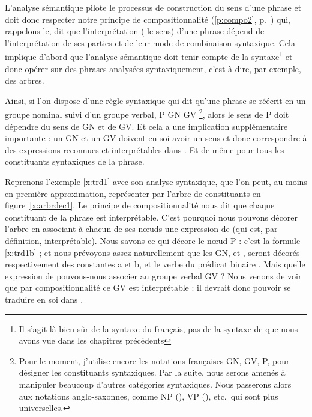 \sloppy

L'analyse sémantique pilote le processus de construction du sens d'une
phrase et doit donc respecter notre principe de compositionnalité
(\ref{p:compo2}, p.~\pageref{p:compo2}) qui, rappelons-le, dit que
l'interprétation ({\ie} le sens) d'une phrase dépend de l'interprétation
de ses parties et de leur mode de combinaison syntaxique.  Cela
implique d'abord que l'analyse sémantique doit tenir compte de la
syntaxe\footnote{Il s'agit là bien sûr de la syntaxe du français, pas
  de la syntaxe de {\LO} que nous avons vue dans les chapitres
  précédents} et donc opérer sur des phrases analysées syntaxiquement,
c'est-à-dire, par exemple, des arbres.

\fussy

Ainsi, si l'on dispose d'une règle syntaxique qui dit qu'une phrase se
réécrit en un groupe nominal suivi d'un groupe verbal, P {\reecr} GN
GV%
\footnote{Pour le moment, j'utilise encore les notations françaises GN, GV, P, pour désigner les constituants syntaxiques. Par la suite, nous serons amenés à manipuler beaucoup d'autres catégories syntaxiques. Nous passerons alors aux notations anglo-saxonnes, comme NP (), VP (), etc.\ qui sont plus universelles. }, 
alors le sens de P doit dépendre du sens de GN et de GV.  Et cela
a une implication supplémentaire importante : un GN et un GV doivent
en soi avoir un sens et donc correspondre à des expressions
reconnues et  interprétables dans {\LO}.  Et de même pour tous les
constituants syntaxiques de la phrase.

Reprenons l'exemple \ref{x:trd1} avec son analyse syntaxique, que
l'on peut, au moins en première approximation, représenter par l'arbre
de constituants en figure~\ref{x:arbrdec1}. Le principe de compositionnalité
nous dit que chaque constituant de la phrase est interprétable.  C'est
pourquoi nous pouvons décorer l'arbre en associant à chacun de ses
n\oe uds une expression de {\LO} (qui est, par définition,
interprétable).  Nous savons ce qui décore le n\oe ud P : c'est la
formule \ref{x:trd1b} ; et nous prévoyons assez naturellement que les
GN,  et , seront décorés respectivement des
constantes \cns a et \cns b, et le verbe  du prédicat
binaire .  Mais quelle expression de {\LO} pouvons-nous
associer au groupe verbal GV ?  Nous venons de voir que par
compositionnalité ce GV est interprétable : il devrait donc pouvoir se
traduire en soi dans {\LO}.
  


